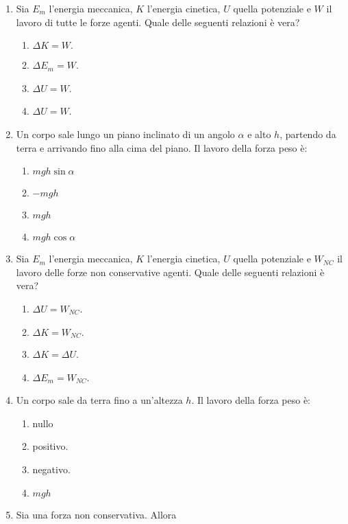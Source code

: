 \documentclass{article}
\begin{document}
\begin{enumerate}
\begin{enumerate}[label=\Alph*.]
    \item $\frac{v^2}{2g\mu}}$.
  \end{enumerate}
  \item Sia $E_m$ l'energia meccanica, $K$ l'energia cinetica, $U$ quella potenziale e $W$ il lavoro di tutte le forze agenti. Quale delle seguenti relazioni è vera?
  \begin{enumerate}[label=\Alph*.]
    \item $\Delta K=W.$
    \item $\Delta E_m=W$.
    \item $\Delta U=W$.
    \item $\Delta U=W$.
  \end{enumerate}
  \item Un corpo sale lungo un piano inclinato di un angolo $\alpha$ e alto $h$, partendo da terra e arrivando fino alla cima del piano. Il lavoro della forza peso è:
  \begin{enumerate}[label=\Alph*.]
    \item $mgh\sin\alpha$
    \item $-mgh$
    \item $mgh$
    \item $mgh\cos\alpha$
  \end{enumerate}
  \item Sia $E_m$ l'energia meccanica, $K$ l'energia cinetica, $U$ quella potenziale e $W_{NC}$ il lavoro delle forze non conservative agenti. Quale delle seguenti relazioni è vera?
  \begin{enumerate}[label=\Alph*.]
    \item $\Delta U=W_{NC}$.
    \item $\Delta K=W_{NC}.$
    \item $\Delta K = \Delta U$.
    \item $\Delta E_m=W_{NC}$.
  \end{enumerate}
  \item Un corpo sale da terra fino a un'altezza $h$. Il lavoro della forza peso è:
  \begin{enumerate}[label=\Alph*.]
    \item nullo
    \item positivo.
    \item negativo.
    \item $mgh$
  \end{enumerate}
  \item Sia  una forza non conservativa. Allora
  \begin{enumerate}[label=\Alph*.]

\end{enumerate}
\end{enumerate}
\end{document}
